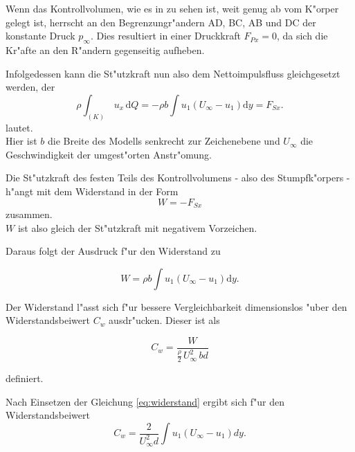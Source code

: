 Wenn das Kontrollvolumen, wie es in  zu sehen ist, weit genug ab vom K"orper gelegt ist, herrscht an den Begrenzungr"andern AD, BC, AB und DC der konstante Druck $p_{\infty}$.
Dies resultiert in einer Druckkraft $F_{Px} = 0$, da sich die Kr"afte an den R"andern gegenseitig aufheben.

Infolgedessen kann die St"utzkraft nun also dem Nettoimpulsfluss gleichgesetzt werden, der
\begin{equation}
	\label{eq:nettoimpulsfluss}
	\rho \int_{(K)} \, u_x \, \mathrm{d}Q	= -\rho b \int u_1(U_{\infty} - u_1) \mathrm{d}y = F_{Sx}.	
\end{equation}
lautet.\\
Hier ist $b$ die Breite des Modells senkrecht zur Zeichenebene und $U_{\infty}$ die Geschwindigkeit der umgest"orten Anstr"omung.

Die St"utzkraft des festen Teils des Kontrollvolumens - also des Stumpfk"orpers - h"angt mit dem Widerstand in der Form
\begin{equation}
	\label{eq:W=-F_Sx}
	W = - F_{Sx}
\end{equation}
zusammen.\\
$W$ ist also gleich der St"utzkraft mit negativem Vorzeichen.

Daraus folgt der Ausdruck f"ur den Widerstand zu
\begin{center}
	\begin{equation}
		\label{eq:widerstand}
		W = \rho b \int u_{1} (U_{\infty}- u_{1}) \mathrm{d}y.
	\end{equation}
\end{center}

Der Widerstand l"asst sich f"ur bessere Vergleichbarkeit dimensionslos "uber den Widerstandsbeiwert $C_w$ ausdr"ucken. Dieser ist als 
\begin{center}
	\begin{equation}
		\label{eq:def-c_w}
		C_w = \frac{W}{\frac{\rho}{2}\, U_{\infty}^2 \, bd}
	\end{equation}
\end{center}
definiert.

Nach Einsetzen der Gleichung \ref{eq:widerstand} ergibt sich f"ur den Widerstandsbeiwert
\begin{equation}
	\label{eq:Bestimmungsgleichung C_w}
	C_w = \frac{2}{U_{\infty}^2 d} \int u_{1}(U_{\infty} - u_{1}) dy.
\end{equation}


